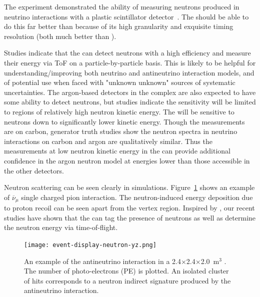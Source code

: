 The  experiment demonstrated the ability of measuring neutrons produced in neutrino interactions with a plastic scintillator detector~\cite{Elkins:2019vmy}. 
The  should be able to do this far better than  because of its high granularity and exquisite timing resolution (both much better than ). 

Studies indicate that the  can detect neutrons with a high efficiency and measure their energy via ToF on a particle-by-particle basis.  This is likely to be helpful for 
understanding/improving both neutrino and antineutrino interaction models, and of potential use when faced with "unknown unknown" sources of systematic uncertainties. The argon-based detectors in the  complex are also expected to have some ability to detect neutrons, but studies indicate the sensitivity will be limited to regions of relatively high neutron kinetic energy.  The  will be sensitive to neutrons down to significantly lower kinetic energy.  Though the measurements are on carbon, generator truth studies show the neutron spectra in neutrino interactions on carbon and argon are qualitatively similar. Thus the measurements at low neutron kinetic energy in the  can provide additional confidence in the argon neutron model at energies lower than those accessible in the other detectors. 

Neutron scattering can  be seen clearly in  simulations. 
Figure~\ref{fig:NeutronDisplay} shows an example of
$\overline{\nu}_{\mu}$   single charged pion interaction. The neutron-induced energy deposition due to proton recoil can be seen apart from the vertex region. 
Inspired by , our recent studies have shown that the  can tag the presence of neutrons as well as determine the neutron energy via time-of-flight. \\


\begin{figure}
\begin{center}
  \texttt{[image: event-display-neutron-yz.png]}
\caption{\label{fig:NeutronDisplay} An example of the antineutrino
interaction in a 2.4$\times$2.4$\times$2.0~m$^{3}$ . 
The number of photo-electrons (PE) is plotted.
An isolated cluster of hits 
corresponds to a neutron indirect signature produced by the antineutrino interaction.
} 
\end{center}
\end{figure}


